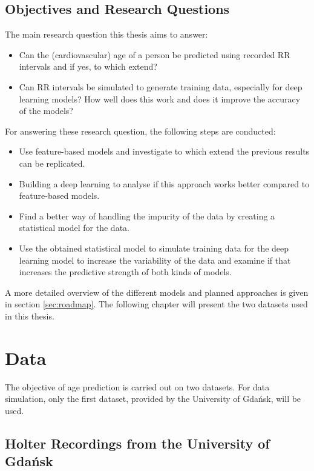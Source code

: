 \documentclass[11pt]{scrartcl}
\begin{document}
\subsection{Objectives and Research Questions}

The main research question this thesis aims to answer:

\begin{itemize}
    \item Can the (cardiovascular) age of a person be predicted using recorded RR intervals and if yes, to which extend?
    \item Can RR intervals be simulated to generate training data, especially for deep learning models? How well does this work and does it improve the accuracy of the models?
\end{itemize}

For answering these research question, the following steps are conducted:

\begin{itemize}
	\item Use feature-based models and investigate to which extend the previous results can be replicated.
	\item Building a deep learning to analyse if this approach works better compared to feature-based models.
	\item Find a better way of handling the impurity of the data by creating a statistical model for the data.
	\item Use the obtained statistical model to simulate training data for the deep learning model to increase the variability of the data and examine if that increases the predictive strength of both kinds of models.
\end{itemize}

A more detailed overview of the different models and planned approaches is given in section \ref{sec:roadmap}. The following chapter will present the two datasets used in this thesis.

\clearpage
\section{Data}

The objective of age prediction is carried out on two datasets. For data simulation, only the first dataset, provided by the University of Gdańsk, will be used.

\subsection{Holter Recordings from the University of Gdańsk}
\end{document}
